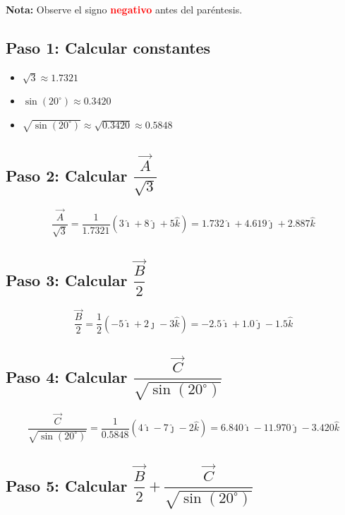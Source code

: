 \documentclass[12pt,letterpaper]{article}
\begin{document}
\textbf{Nota:} Observe el signo \textcolor{red}{\textbf{negativo}} antes del par\'entesis.

\subsection*{Paso 1: Calcular constantes}

\begin{itemize}
    \item $\sqrt{3} \approx 1.7321$
    \item $\sin(20^\circ) \approx 0.3420$
    \item $\sqrt{\sin(20^\circ)} \approx \sqrt{0.3420} \approx 0.5848$
\end{itemize}

\subsection*{Paso 2: Calcular $\dfrac{\vec{A}}{\sqrt{3}}$}

\begin{equation*}
\frac{\vec{A}}{\sqrt{3}} = \frac{1}{1.7321}(3\hat{\imath}+8\hat{\jmath}+5\hat{k}) = \boxed{1.732\hat{\imath}+4.619\hat{\jmath}+2.887\hat{k}}
\end{equation*}

\subsection*{Paso 3: Calcular $\dfrac{\vec{B}}{2}$}

\begin{equation*}
\frac{\vec{B}}{2} = \frac{1}{2}(-5\hat{\imath}+2\hat{\jmath}-3\hat{k}) = \boxed{-2.5\hat{\imath}+1.0\hat{\jmath}-1.5\hat{k}}
\end{equation*}

\subsection*{Paso 4: Calcular $\dfrac{\vec{C}}{\sqrt{\sin(20^\circ)}}$}

\begin{equation*}
\frac{\vec{C}}{\sqrt{\sin(20^\circ)}} = \frac{1}{0.5848}(4\hat{\imath}-7\hat{\jmath}-2\hat{k}) = \boxed{6.840\hat{\imath}-11.970\hat{\jmath}-3.420\hat{k}}
\end{equation*}

\subsection*{Paso 5: Calcular $\dfrac{\vec{B}}{2}+\dfrac{\vec{C}}{\sqrt{\sin(20^\circ)}}$}
\end{document}
